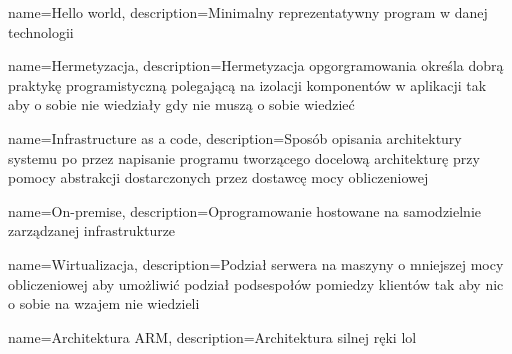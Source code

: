 {
    name={Hello world},
    description={Minimalny reprezentatywny program w danej technologii}
}

{
    name={Hermetyzacja},
    description={Hermetyzacja opgorgramowania określa dobrą praktykę programistyczną polegającą na izolacji komponentów w aplikacji tak aby o sobie nie wiedziały gdy nie muszą o sobie wiedzieć}
}

{
    name={Infrastructure as a code},
    description={Sposób opisania architektury systemu po przez napisanie programu tworzącego docelową architekturę przy pomocy abstrakcji dostarczonych przez dostawcę mocy obliczeniowej}
}

{
    name={On-premise},
    description={Oprogramowanie hostowane na samodzielnie zarządzanej infrastrukturze}
}

{
    name={Wirtualizacja},
    description={Podział serwera na maszyny o mniejszej mocy obliczeniowej aby umożliwić podział podsespołów pomiedzy klientów tak aby nic o sobie na wzajem nie wiedzieli}
}

{
    name={Architektura ARM},
    description={Architektura silnej ręki lol}
}
